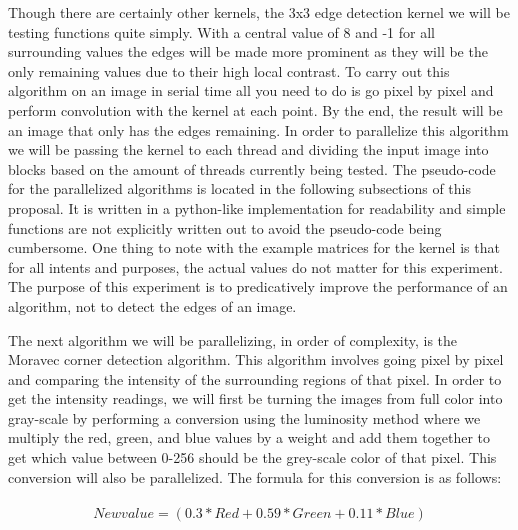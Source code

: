 \documentclass{article}
\begin{document}
        Though there are certainly other kernels, the 3x3 edge detection kernel we will be testing functions quite simply.  With a central value of 8 and -1 for all surrounding values the edges will be made more prominent as they will be the only remaining values due to their high local contrast.  To carry out this algorithm on an image in serial time all you need to do is go pixel by pixel and perform convolution with the kernel at each point.  By the end, the result will be an image that only has the edges remaining.  In order to parallelize this algorithm we will be passing the kernel to each thread and dividing the input image into blocks based on the amount of threads currently being tested.  The pseudo-code for the parallelized algorithms is located in the following subsections of this proposal.  It is written in a python-like implementation for readability and simple functions are not explicitly written out to avoid the pseudo-code being cumbersome.  One thing to note with the example matrices for the kernel is that for all intents and purposes, the actual values do not matter for this experiment.  The purpose of this experiment is to predicatively improve the performance of an algorithm, not to detect the edges of an image.
        
        The next algorithm we will be parallelizing, in order of complexity, is the Moravec corner detection algorithm.  This algorithm involves going pixel by pixel and comparing the intensity of the surrounding regions of that pixel.  In order to get the intensity readings, we will first be turning the images from full color into gray-scale by performing a conversion using the luminosity method where we multiply the red, green, and blue values by a weight and add them together to get which value between 0-256 should be the grey-scale color of that pixel.  This conversion will also be parallelized.  The formula for this conversion is as follows:\\\\
        
        \[New value = (0.3*Red + 0.59*Green + 0.11*Blue)\]\\
        
\end{document}
